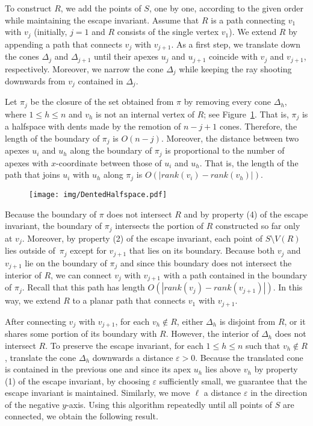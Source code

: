 \documentclass[a4paper, 11pt]{article}
\begin{document}
To construct $R$, we add the points of $S$, one by one, according to the given order while maintaining the escape invariant.
Assume that $R$ is a path connecting $v_1$ with $v_j$ (initially, $j=1$ and $R$ consists of the single vertex $v_1$).
We extend $R$ by appending a path that connects $v_j$ with $v_{j+1}$. 
As a first step, we translate down the cones $\Delta_j$ and $\Delta_{j+1}$ until their apexes $u_j$ and $u_{j+1}$ coincide with $v_j$ and $v_{j+1}$, respectively. Moreover, we narrow the cone $\Delta_j$ while keeping the ray shooting downwards from $v_j$ contained in $\Delta_j$.

Let $\pi_j$ be the closure of the set obtained from $\pi$ by removing every cone $\Delta_h$, where $1\leq h\leq n$ and $v_h$ is not an internal vertex of $R$; see Figure~\ref{fig:Dented Halfspace}. That is, $\pi_j$ is a halfspace with dents made by the remotion of $n-j+1$ cones.
Therefore, the length of the boundary of $\pi_j$ is $O(n-j)$. 
Moreover, the distance between two apexes $u_i$ and $u_h$ along the boundary of $\pi_j$ is proportional to the number of apexes with $x$-coordinate between those of $u_i$ and $u_h$. That is, the length of the path that joins $u_i$ with $u_h$ along $\pi_j$ is $O(|rank(v_i) - rank(v_h)|)$. 

\begin{figure}[tb]
\centering
\texttt{[image: img/DentedHalfspace.pdf]}
\caption{\small }
\label{fig:Dented Halfspace}
\end{figure}


Because the boundary of $\pi$ does not intersect $R$ and by property (4) of the escape invariant, the boundary of $\pi_j$ intersects the portion of $R$ constructed so far only at $v_j$. Moreover, by property (2) of the escape invariant, each point of $S\setminus V(R)$ lies outside of~$\pi_j$ except for $v_{j+1}$ that lies on its boundary.
Because both $v_j$ and $v_{j+1}$ lie on the boundary of $\pi_j$ and since this boundary does not intersect the interior of $R$, we can connect $v_j$ with $v_{j+1}$ with a path contained in the boundary of $\pi_j$. 
Recall that this path has length $O(|rank(v_j) - rank(v_{j+1})|)$. In this way, we extend $R$ to a planar path that connects $v_1$ with $v_{j+1}$.

After connecting $v_j$ with $v_{j+1}$, for each $v_h\notin R$, either $\Delta_h$ is disjoint from $R$, or it shares some portion of its boundary with $R$. However, the interior of $\Delta_h$ does not intersect $R$.
To preserve the escape invariant, for each $1\leq h\leq n$ such that $v_h\notin R$, translate the cone $\Delta_h$ downwards a distance $\varepsilon>0$. Because the translated cone is contained in the previous one and since its apex $u_h$ lies above $v_h$ by property (1) of the escape invariant, by choosing $\varepsilon$ sufficiently small, we guarantee that the escape invariant is maintained. Similarly, we move $\ell$ a distance $\varepsilon$ in the direction of the negative $y$-axis. Using this algorithm repeatedly until all points of $S$ are connected, we obtain the following result.
\end{document}
